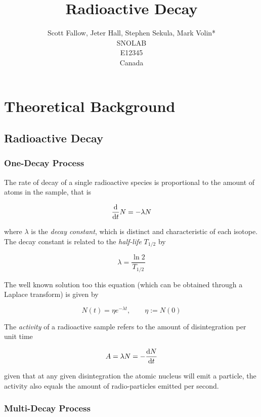 \documentclass{article}
\title{Radioactive Decay}
\author{Scott Fallow, Jeter Hall, Stephen Sekula, Mark Volin*\\
  \small SNOLAB\\
  \small E12345\\
  \small Canada 
}
\theoremstyle{definition}
\theoremstyle{remark}
\newcommand\hide[1]{}
\begin{document}
\maketitle
\hide{
	\abstract{This is a simple template for an article written in \LaTeX.}
}
\section{Theoretical Background}

\subsection{Radioactive Decay}

\subsubsection{One-Decay Process}

The rate of decay of a single radioactive species is proportional to the amount of atoms in the sample, that is

\begin{equation}
	\dv{t}N=-\lambda N
\end{equation}

where $\lambda$ is the \textit{decay constant}, which is distinct and
characteristic of each isotope. The decay constant is related to the
\textit{half-life} $T_{1/2}$ by

\begin{equation}
	\lambda=\frac{\ln{2}}{T_{1/2}}
\end{equation}

The well known solution too this equation (which can be obtained through a
Laplace transform) is given by

\begin{equation}
	N(t)=\eta e^{-\lambda t}, \qquad \eta:=N(0)
\end{equation}

The \textit{activity} of a radioactive sample refers to the amount of disintegration per unit time

\begin{equation}
	A = \lambda N = -\dv{N}{t}
\end{equation}

given that at any given disintegration the atomic nucleus will emit a particle, the activity also equals the amount of radio-particles emitted per second.

\subsubsection{Multi-Decay Process}
\end{document}
